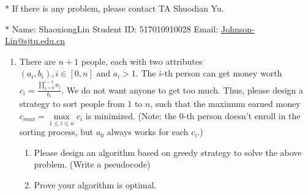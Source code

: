 \documentclass[12pt,a4paper]{article}
\theoremstyle{definition}
\begin{document}
\noindent

\noindent{}
\begin{center}
\footnotesize{\color{red}$*$ If there is any problem, please contact TA Shuodian Yu.}

\footnotesize{\color{blue}$*$ Name: ShaoxiongLin  \quad Student ID: 517010910028 \quad Email: \href{mailto:Johnson-Lin@sjtu.edu.cn}{Johnson-Lin@sjtu.edu.cn}}
\end{center}

\begin{enumerate}
    \item
    There are $n+1$ people, each with two attributes $(a_i,b_i), i\in[0,n] \text{ and } a_i>1$. The $i$-th person can get money worth $c_i = \frac{\prod_{j=0}^{i-1}{a_j}}{b_i}$. We do not want anyone to get too much. Thus, please design a strategy to sort people from $1$ to $n$, such that the maximum earned money $c_{max}=\max\limits_{1\leq i\leq n} c_i$ is minimized. (Note: the 0-th person doesn't enroll in the sorting process, but $a_0$ always works for each $c_i$.)
    \begin{enumerate}
        \item Please design an algorithm based on greedy strategy to solve the above problem. (Write a pseudocode)
        \item Prove your algorithm is optimal.
    \end{enumerate}


\end{enumerate}
\end{document}
